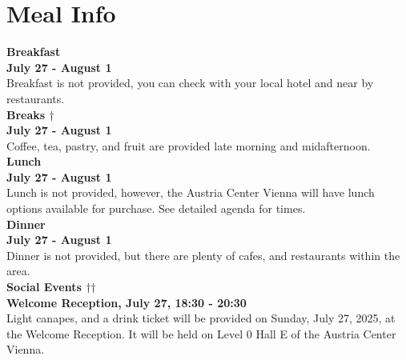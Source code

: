 \chapter{Meal Info}
\vspace*{0.2cm}

\textbf{Breakfast}\\

\hspace{1cm} \textbf{July 27 - August 1}\\
\hspace{1cm} Breakfast is not provided, you can check with your local hotel and near by restaurants.\\

\textbf{Breaks $\dagger$}\\

\hspace{1cm} \textbf{July 27 - August 1}\\
\hspace{1cm} Coffee, tea, pastry, and fruit are provided late morning and midafternoon.\\

\textbf{Lunch}\\

\hspace{1cm} \textbf{July 27 - August 1}\\
\hspace{1cm} Lunch is not provided, however, the Austria Center Vienna will have lunch options available for purchase. See detailed agenda for times. \\

\textbf{Dinner}\\

\hspace{1cm} \textbf{July 27 - August 1}\\
\hspace{1cm} Dinner is  not provided, but there are plenty of cafes, and restaurants within the area.\\

\textbf{Social Events $\dagger$$\dagger$} \\

\textbf{Welcome Reception, July 27, 18:30 - 20:30}\\

\hspace{1cm} Light canapes, and a drink ticket will be provided on Sunday, July 27, 2025, at the Welcome Reception. It will be held on Level 0 Hall E of the Austria Center Vienna.\\

